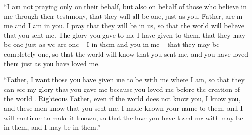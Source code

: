 {\par }{\PP {}“I am
not
praying
only
on
their
behalf,
but
also
on behalf
of those who believe
in
me
through
their
testimony,
that
they will
all
be
one,
just as
you,
Father,
are in
me
and I
am in
you.
I pray that they
will be
in
us,
so that
the world
will believe
that
you
sent
me.
The glory
you gave
to me
I have given
to them,
that
they may be
one
just as
we
are one –
I
in
them
and
you
in
me
– that
they may be
completely
one,
so that
the world
will know
that
you
sent
me,
and
you have loved
them
just as
you have loved
me.
\par }{\PP {}“Father,
I want
those
you have given
me
to
be
with
me
where
I
am,
so that
they can see
my
glory
that
you gave
me
because
you loved
me
before
the creation
of the world .
Righteous
Father,
even
if the world
does
not
know
you,
I
know
you,
and
these men
know
that
you
sent
me.
I made known
your
name
to them,
and
I will continue to make
it known,
so that
the love
you have loved
me
with may be
in
them,
and I
may be in
them.”

}
